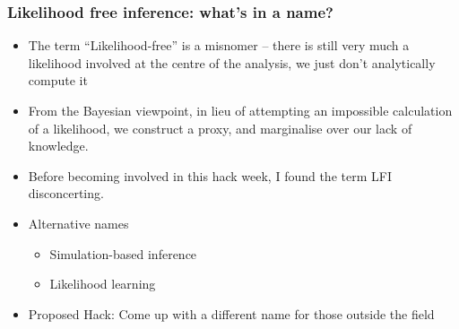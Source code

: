 \documentclass[%
    9pt,
]{beamer}
\begin{document}
\begin{frame}
    \frametitle{Likelihood free inference: what's in a name?}
    \begin{itemize}
        \item The term ``Likelihood-free'' is a misnomer -- there is still very much a likelihood involved at the centre of the analysis, we just don't analytically compute it
        \item From the Bayesian viewpoint, in lieu of attempting an impossible calculation of a likelihood, we construct a proxy, and marginalise over our lack of knowledge.
        \item Before becoming involved in this hack week, I found the term LFI disconcerting.
        \item Alternative names
            \begin{itemize}
                \item Simulation-based inference
                \item Likelihood learning
            \end{itemize}
        \item Proposed Hack: Come up with a different name for those outside the field
    \end{itemize}
\end{frame}
\end{document}
